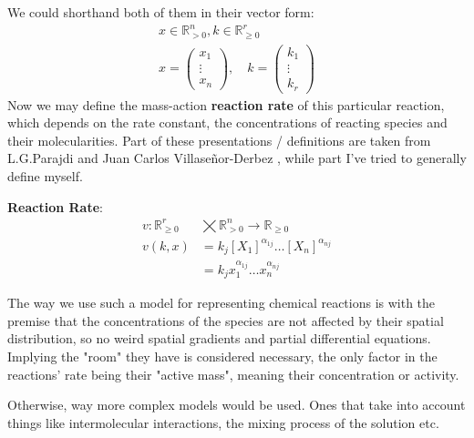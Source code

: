 We could shorthand both of them in their vector form:
\begin{gather*}
	x \in \mathbb{R}^n_{> 0},  k \in \mathbb{R}^r_{\geq 0} \\
	x =
	\begin{pmatrix}
		x_1 \\
		\vdots \\
		x_n 	
	\end{pmatrix}, \quad k =
	\begin{pmatrix*}
		k_1  \\
		\vdots \\
		k_r	
	\end{pmatrix*}
\end{gather*}
Now we may define the mass-action \textbf{reaction rate} of this particular reaction, which depends on the rate constant, the concentrations of reacting species and their molecularities. Part of these  presentations / definitions are taken from  L.G.Parajdi \cite{Lorand2024} and Juan Carlos Villaseñor-Derbez \cite{Derbez2015}, while part I've tried to generally define myself.
\begin{definition}
	\textbf{Reaction Rate}:	
	\begin{align}\label{reaction_rate}
		v : \mathbb{R}^r_{\geq 0}  &\bigtimes \mathbb{R}^n_{> 0} \rightarrow \mathbb{R}_{\geq 0}  \nonumber \\
		v(k,x) &= k_j [X_1]^{\alpha_{1j}} \dots [X_n]^{\alpha_{nj}} \\
		&= k_j x_1^{\alpha_{1j}} \dots x_n^{\alpha_{nj}} \nonumber
	\end{align}
\end{definition}

The way we use such a model for representing chemical reactions is with the premise that the concentrations of the species are not affected by their spatial distribution, so no weird spatial gradients and partial differential equations. Implying the "room" they have is considered necessary, the only factor in the reactions' rate being their "active mass", meaning their concentration or activity.

Otherwise, way more complex models would be used. Ones that take into account things like intermolecular interactions, the mixing process of the solution etc.

